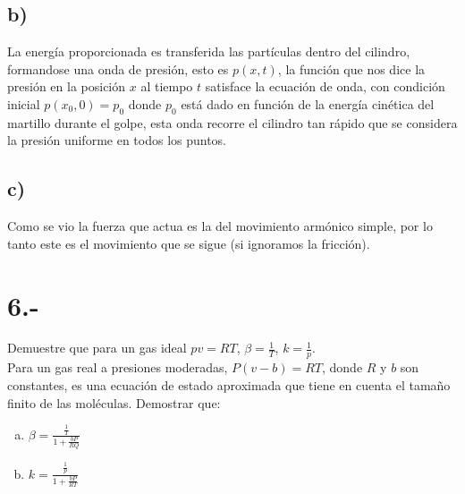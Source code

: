 \documentclass{article}
\begin{document}
\begin{tcolorbox}[breakable]
    \subsection*{b)}
    La energía proporcionada es transferida las partículas dentro del cilindro, 
    formandose una onda de presión, esto es $p(x,t)$, la función que nos dice la 
    presión en la posición $x$ al tiempo $t$ satisface la ecuación 
    de onda, con condición inicial $p(x_0,0) = p_0$ donde $p_0$ está dado en 
    función de la energía cinética del martillo durante el golpe, esta onda 
    recorre el cilindro tan rápido que se considera la presión uniforme 
    en todos los puntos. 
    \subsection*{c)}
    Como se vio la fuerza que actua es la del movimiento armónico simple, por lo 
    tanto este es el movimiento que se sigue (si ignoramos la fricción).
    
\end{tcolorbox}
\section*{6.-}
Demuestre que para un gas ideal $pv = RT$, $\beta = \frac{1}{T}$, $k = \frac{1}{p}$. \\
Para un gas real a presiones moderadas, $P(v-b) = RT$, donde $R$ y $b$ son constantes, 
es una ecuación de estado aproximada que tiene en cuenta el tamaño finito de las moléculas.
Demostrar que:
\begin{enumerate}[a)]
    \item $\beta = \frac{\frac{1}{T}}{1+\frac{bP}{RQ}}$
    \item $k = \frac{\frac{1}{p}}{1+\frac{bP}{RT}} $
\end{enumerate}
\end{document}
